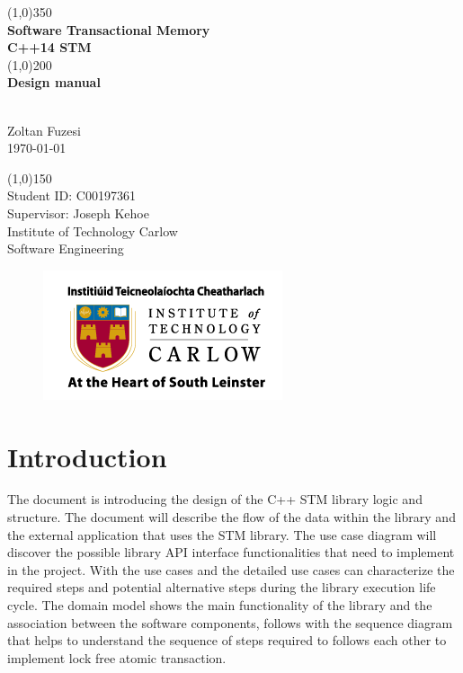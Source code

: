 \documentclass[12pt]{article}
\begin{document}
\begin{titlepage}
	\begin{center}
	\line(1,0){350}\\
	[0.3 cm]
	\huge{\textbf{Software Transactional Memory\\[0.3 cm]C++14 STM\\ }} 
	\line(1,0){200}\\
	[0.3 cm]
	\huge{\textbf{Design manual }} 
		\begin{LARGE}
		\\[0.3 cm]Zoltan Fuzesi\\
		\today
		\end{LARGE}
		
		\begin{LARGE}
		\line(1,0){150}\\
		[1.0 cm]
		Student ID: C00197361\\
		Supervisor: Joseph Kehoe\\
		\color{gray}Institute of Technology Carlow\\
		\color{gray}Software Engineering
		\end{LARGE}
		
\begin{figure}[h!]
\centering
\includegraphics[scale=0.7]{Pictures/carlow.png}
\end{figure}
		
	\end{center}
\end{titlepage}

\tableofcontents







\clearpage
{}
\setcounter{page}{1}

\section{Introduction}
The document is introducing the design of the C++ STM library logic and structure. The document will describe the flow of the data within the library and the external application that uses the STM library. The use case diagram will discover the possible library API interface functionalities that need to implement in the project. With the use cases and the detailed use cases can characterize the required steps and potential alternative steps during the library execution life cycle. The domain model shows the main functionality of the library and the association between the software components, follows with the sequence diagram that helps to understand the sequence of steps required to follows each other to implement lock free atomic transaction.\\
\end{document}
